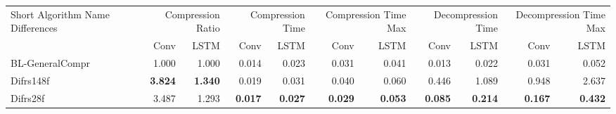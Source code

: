 \begin{tabular}{lrrrrrrrrrr}
\toprule
\multicolumn{1}{p{2.5cm}}{Short Algorithm Name Differences} & \multicolumn{2}{p{2cm}}{Compression Ratio} & \multicolumn{2}{p{2cm}}{Compression Time} & \multicolumn{2}{p{2cm}}{Compression Time Max} & \multicolumn{2}{p{2cm}}{Decompression Time} & \multicolumn{2}{p{2cm}}{Decompression Time Max} \\
 & Conv & LSTM & Conv & LSTM & Conv & LSTM & Conv & LSTM & Conv & LSTM \\
\midrule
BL-GeneralCompr & 1.000 & 1.000 & 0.014 & 0.023 & 0.031 & 0.041 & 0.013 & 0.022 & 0.031 & 0.052 \\
Difrs148f & \bfseries 3.824 & \bfseries 1.340 & 0.019 & 0.031 & 0.040 & 0.060 & 0.446 & 1.089 & 0.948 & 2.637 \\
Difrs28f & 3.487 & 1.293 & \bfseries 0.017 & \bfseries 0.027 & \bfseries 0.029 & \bfseries 0.053 & \bfseries 0.085 & \bfseries 0.214 & \bfseries 0.167 & \bfseries 0.432 \\
\bottomrule
\end{tabular}
